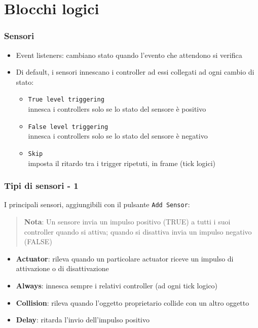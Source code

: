 \documentclass{beamer}
\def\code#1{\texttt{#1}}
\begin{document}
	\section{Blocchi logici}
		\begin{frame}		%
			\frametitle{Sensori}
			\begin{itemize}
				\item Event listeners: \textcolor{BlenderOrange}{cambiano stato} quando l'evento che attendono si verifica
				\item Di default, i sensori \textcolor{BlenderOrange}{innescano i controller} ad essi collegati ad ogni cambio di stato:
				\begin{itemize}
					\item \code{True level triggering} \\ {\footnotesize\hspace{1em} innesca i controllers solo se lo stato del sensore è positivo}
					\item \code{False level triggering} \\ {\footnotesize\hspace{1em}innesca i controllers solo se lo stato del sensore è negativo}
					\item \code{Skip} \\ {\footnotesize\hspace{1em}imposta il ritardo tra i trigger ripetuti, in frame (tick logici)}
				\end{itemize}
			\end{itemize}
		\end{frame}		
		\begin{frame}
			\frametitle{Tipi di sensori - 1}
			I principali sensori, aggiungibili con il pulsante \code{Add Sensor}:\\
			\begin{quote}
			\textcolor{BlenderOrange}{\textbf{Nota}: Un sensore invia un impulso positivo (TRUE) a tutti i suoi controller quando si attiva; quando si disattiva invia un impulso negativo (FALSE)}
			\end{quote}
						
			\begin{itemize}
				\item \textbf{Actuator}: rileva quando un particolare actuator riceve un impulso di attivazione o di disattivazione
				\item \textbf{Always}: innesca sempre i relativi controller (ad ogni tick logico)
				\item \textbf{Collision}: rileva quando l'oggetto proprietario collide con un altro oggetto
				\item \textbf{Delay}: ritarda l'invio dell'impulso positivo
			\end{itemize}
		\end{frame}	
\end{document}
